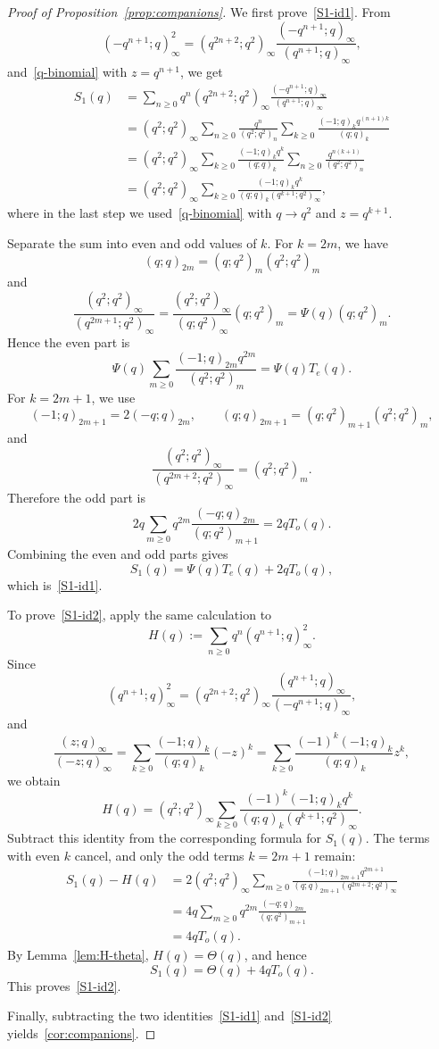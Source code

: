\documentclass[reqno]{amsart}
\theoremstyle{plain}
\theoremstyle{definition}
\theoremstyle{remark}
\numberwithin{equation}{section}
\newcommand{\qpoch}[2]{(#1;#2)_\infty}
\newcommand{\qpochn}[3]{(#1;#2)_{#3}}
\begin{document}
\begin{proof}[Proof of Proposition~\ref{prop:companions}]
We first prove~\eqref{S1-id1}. From
\[
\qpoch{-q^{n+1}}{q}^{2}
=\qpoch{q^{2n+2}}{q^2}
\frac{\qpoch{-q^{n+1}}{q}}{\qpoch{q^{n+1}}{q}},
\]
and~\eqref{q-binomial} with $z=q^{n+1}$, we get
\begin{align*}
S_1(q) &=\sum_{n\ge 0}q^n\qpoch{q^{2n+2}}{q^2}
\frac{\qpoch{-q^{n+1}}{q}}{\qpoch{q^{n+1}}{q}} \\
&=\qpoch{q^2}{q^2}\sum_{n\ge 0}\frac{q^n}{\qpochn{q^2}{q^2}{n}}
   \sum_{k\ge 0}\frac{\qpochn{-1}{q}{k}q^{(n+1)k}}{\qpochn{q}{q}{k}} \\
&=\qpoch{q^2}{q^2}\sum_{k\ge 0}\frac{\qpochn{-1}{q}{k}q^k}{\qpochn{q}{q}{k}}
   \sum_{n\ge 0}\frac{q^{n(k+1)}}{\qpochn{q^2}{q^2}{n}} \\
&=\qpoch{q^2}{q^2}\sum_{k\ge 0}
\frac{\qpochn{-1}{q}{k}q^k}{\qpochn{q}{q}{k}\qpoch{q^{k+1}}{q^2}},
\end{align*}
where in the last step we used~\eqref{q-binomial} with $q\to q^2$ and $z=q^{k+1}$.

Separate the sum into even and odd values of $k$.
For $k=2m$, we have
\[
\qpochn{q}{q}{2m}=\qpochn{q}{q^2}{m}\qpochn{q^2}{q^2}{m}
\]
and
\[
\frac{\qpoch{q^2}{q^2}}{\qpoch{q^{2m+1}}{q^2}}
=\frac{\qpoch{q^2}{q^2}}{\qpoch{q}{q^2}}\qpochn{q}{q^2}{m}
=\Psi(q)\qpochn{q}{q^2}{m}.
\]
Hence the even part is
\[
\Psi(q)\sum_{m\ge 0}
\frac{\qpochn{-1}{q}{2m}q^{2m}}{\qpochn{q^2}{q^2}{m}}
=\Psi(q)T_e(q).
\]
For $k=2m+1$, we use
\[
\qpochn{-1}{q}{2m+1}=2\qpochn{-q}{q}{2m},
\qquad
\qpochn{q}{q}{2m+1}=\qpochn{q}{q^2}{m+1}\qpochn{q^2}{q^2}{m},
\]
and
\[
\frac{\qpoch{q^2}{q^2}}{\qpoch{q^{2m+2}}{q^2}}=\qpochn{q^2}{q^2}{m}.
\]
Therefore the odd part is
\[
2q\sum_{m\ge 0}q^{2m}
\frac{\qpochn{-q}{q}{2m}}{\qpochn{q}{q^2}{m+1}}
=2qT_o(q).
\]
Combining the even and odd parts gives
\[
S_1(q)=\Psi(q)T_e(q)+2qT_o(q),
\]
which is~\eqref{S1-id1}.

To prove~\eqref{S1-id2}, apply the same calculation to
\[
H(q):=\sum_{n\ge 0}q^n\qpoch{q^{n+1}}{q}^{2}.
\]
Since
\[
\qpoch{q^{n+1}}{q}^{2}
=\qpoch{q^{2n+2}}{q^2}
\frac{\qpoch{q^{n+1}}{q}}{\qpoch{-q^{n+1}}{q}},
\]
and
\[
\frac{\qpoch{z}{q}}{\qpoch{-z}{q}}
=\sum_{k\ge 0}\frac{\qpochn{-1}{q}{k}}{\qpochn{q}{q}{k}}(-z)^k
=\sum_{k\ge 0}\frac{(-1)^k\qpochn{-1}{q}{k}}{\qpochn{q}{q}{k}}z^k,
\]
we obtain
\[
H(q)=\qpoch{q^2}{q^2}
\sum_{k\ge 0}
\frac{(-1)^k\qpochn{-1}{q}{k}q^k}{\qpochn{q}{q}{k}\qpoch{q^{k+1}}{q^2}}.
\]
Subtract this identity from the corresponding formula for $S_1(q)$. The terms with even $k$ cancel, and only the odd terms $k=2m+1$ remain:
\begin{align*}
S_1(q)-H(q)
&=2\qpoch{q^2}{q^2}
  \sum_{m\ge 0}
\frac{\qpochn{-1}{q}{2m+1}q^{2m+1}}{\qpochn{q}{q}{2m+1}\qpoch{q^{2m+2}}{q^2}} \\
&=4q\sum_{m\ge 0}q^{2m}
\frac{\qpochn{-q}{q}{2m}}{\qpochn{q}{q^2}{m+1}} \\
&=4qT_o(q).
\end{align*}
By Lemma~\ref{lem:H-theta}, $H(q)=\Theta(q)$, and hence
\[
S_1(q)=\Theta(q)+4qT_o(q).
\]
This proves~\eqref{S1-id2}.

Finally, subtracting the two identities~\eqref{S1-id1} and~\eqref{S1-id2} yields~\eqref{cor:companions}.
\end{proof}
\end{document}
